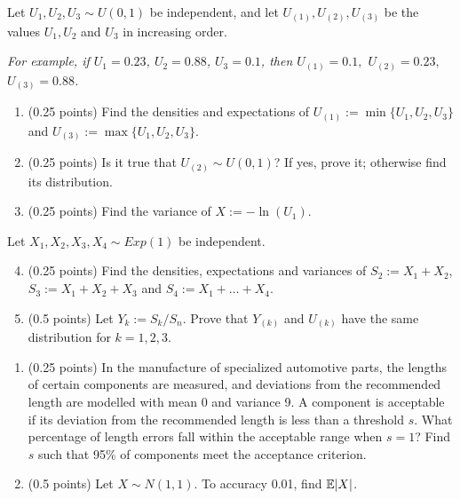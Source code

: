 \documentclass[a4paper]{report}
\begin{document}
\begin{problem}
    Let $U_1,U_2,U_3\sim U(0,1)$ be independent, and let $U_{(1)},U_{(2)},U_{(3)}$
    be the values $U_1,U_2$
    and $U_3$ in increasing order.

\textit{For example, if $U_1=0.23$, $U_2=0.88$, $U_3=0.1$, then
$U_{(1)}=0.1,$ $ U_{(2)}=0.23,$ $ U_{(3)}=0.88$. }
    \begin{enumerate}
        \item (0.25 points) Find the densities and expectations of $U_{(1)}:=\min\{U_1,U_2,U_3\}$ and $U_{(3)}:=
        \max\{U_1, U_2, U_3\}$.
        \item (0.25 points) Is it true that
        $U_{(2)}\sim U(0,1)$? If yes, prove it;
        otherwise find its distribution.
        \item (0.25 points) Find the variance
        of $X:=-\ln(U_1)$.
    \end{enumerate}
    Let $X_1,X_2,X_3,X_4\sim Exp(1)$
    be independent.
    \begin{enumerate}
         \setcounter{enumi}{3}
        \item (0.25 points) Find the densities,
        expectations and variances of
        $S_2:=X_1+X_2$, $S_3:=X_1+X_2+X_3$ and $S_4:=X_1+\dots+X_4$.
        \item (0.5 points) Let $Y_k:={S_k}/{
        S_n}$. Prove that $Y_{(k)}$ and $U_{(k)
}$ have the same distribution for $k=1,2,3$.

    \end{enumerate}
\end{problem}

\begin{problem}
\begin{enumerate}
    \item (0.25 points)
In the manufacture of specialized automotive parts, the lengths of certain components are measured,
and deviations from the recommended length are modelled with mean 0 and variance 9.
A component is acceptable if its deviation from the recommended length is less than a threshold \(s\).
What percentage of length errors fall within the acceptable range when \(s=1\)?
Find \(s\) such that 95\% of components meet the acceptance criterion.

\item (0.5 points) Let $X\sim N(1,1)$. To accuracy 0.01,
find $\mathbb {E}|X|$.
\end{enumerate}




\end{problem}
\end{document}
